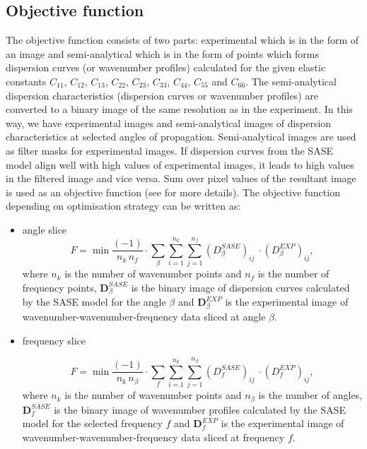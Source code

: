 \documentclass[preprint,12pt]{elsarticle}
\newcommand{\matr}[1]{\mathbf{#1}} %
\begin{document}
\subsection{Objective function}
The objective function consists of two parts: experimental which is in the form of an image and semi-analytical which is in the form of points which forms dispersion curves (or wavenumber profiles) calculated for the given elastic constants $C_{11}$, $C_{12}$, $C_{13}$, $C_{22}$, $C_{23}$, $C_{33}$, $C_{44}$, $C_{55}$ and $C_{66}$.
The semi-analytical dispersion characteristics (dispersion curves or wavenumber profiles) are converted to a binary image of the same resolution as in the experiment. 
In this way, we have experimental images and semi-analytical images of dispersion characteristics at selected angles of propagation. 
Semi-analytical images are used as filter masks for experimental images.
If dispersion curves from the SASE model align well with high values of experimental images, it leads to high values in the filtered image and vice versa.
Sum over pixel values of the resultant image is used as an objective function (see \cite{Kudela2020} for more details).
The objective function depending on optimisation strategy can be written as:
\begin{itemize}
	\item angle slice
\begin{equation}
	F=\min \frac{(-1)}{n_k \, n_f} \cdot \sum_{\beta} \sum_{i=1}^{n_k} \sum_{j=1}^{n_f} (D_{\beta}^{SASE})_{ij} \, \cdot (D_{\beta}^{EXP})_{ij},
	\label{eq:obj_fun_beta}
\end{equation}
where \(n_k\) is the number of wavenumber points and \(n_f\) is the number of frequency points, $\matr{D}_{\beta}^{SASE}$ is the binary image of dispersion curves calculated by the SASE model for the angle $\beta$ and $\matr{D}_{\beta}^{EXP}$ is the experimental image of wavenumber-wavenumber-frequency data sliced at angle $\beta$.

\item frequency slice

\begin{equation}
	F=\min \frac{(-1)}{n_k \, n_{\beta}} \cdot \sum_{f} \sum_{i=1}^{n_k} \sum_{j=1}^{n_{\beta}} (D_{f}^{SASE})_{ij} \, \cdot (D_{f}^{EXP})_{ij},
	\label{eq:obj_fun_freq}
\end{equation}
where \(n_k\) is the number of wavenumber points and \(n_{\beta}\) is the number of angles, $\matr{D}_{f}^{SASE}$ is the binary image of wavenumber profiles calculated by the SASE model for the selected frequency $f$ and $\matr{D}_{f}^{EXP}$ is the experimental image of wavenumber-wavenumber-frequency data sliced at frequency $f$.
\end{itemize}
\end{document}
